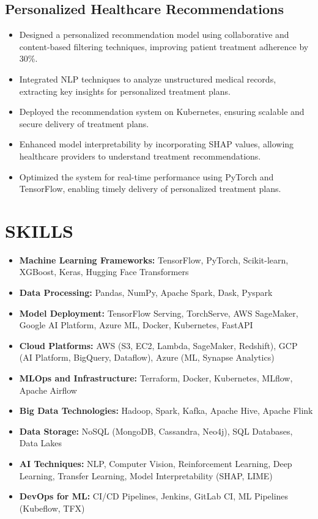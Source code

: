 \documentclass[12pt,a4paper]{article}
\begin{document}
\subsection*{Personalized Healthcare Recommendations}
\begin{itemize}[leftmargin=*,noitemsep,topsep=0pt]
\item Designed a personalized recommendation model using collaborative and content-based filtering techniques, improving patient treatment adherence by 30\%.
\item Integrated NLP techniques to analyze unstructured medical records, extracting key insights for personalized treatment plans.
\item Deployed the recommendation system on Kubernetes, ensuring scalable and secure delivery of treatment plans.
\item Enhanced model interpretability by incorporating SHAP values, allowing healthcare providers to understand treatment recommendations.
\item Optimized the system for real-time performance using PyTorch and TensorFlow, enabling timely delivery of personalized treatment plans.
\end{itemize}

\section*{SKILLS}
\begin{itemize}[leftmargin=*,noitemsep,topsep=0pt]
\item \textbf{Machine Learning Frameworks:} TensorFlow, PyTorch, Scikit-learn, XGBoost, Keras, Hugging Face Transformers
\item \textbf{Data Processing:} Pandas, NumPy, Apache Spark, Dask, Pyspark
\item \textbf{Model Deployment:} TensorFlow Serving, TorchServe, AWS SageMaker, Google AI Platform, Azure ML, Docker, Kubernetes, FastAPI
\item \textbf{Cloud Platforms:} AWS (S3, EC2, Lambda, SageMaker, Redshift), GCP (AI Platform, BigQuery, Dataflow), Azure (ML, Synapse Analytics)
\item \textbf{MLOps and Infrastructure:} Terraform, Docker, Kubernetes, MLflow, Apache Airflow
\item \textbf{Big Data Technologies:} Hadoop, Spark, Kafka, Apache Hive, Apache Flink
\item \textbf{Data Storage:} NoSQL (MongoDB, Cassandra, Neo4j), SQL Databases, Data Lakes
\item \textbf{AI Techniques:} NLP, Computer Vision, Reinforcement Learning, Deep Learning, Transfer Learning, Model Interpretability (SHAP, LIME)
\item \textbf{DevOps for ML:} CI/CD Pipelines, Jenkins, GitLab CI, ML Pipelines (Kubeflow, TFX)
\end{itemize}
\end{document}
